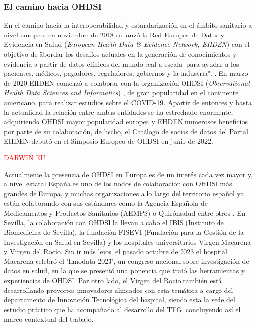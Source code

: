 
\subsubsection{El camino hacia OHDSI}

En el camino hacia la interoperabilidad y estandarización en el ámbito sanitario a nivel europeo, en noviembre de 2018 se lanzó la Red Europea de Datos y Evidencia en Salud (\textit{European Health Data \& Evidence Network, EHDEN}) con el objetivo de \"abordar los desafíos actuales en la generación de conocimientos y evidencia a partir de datos clínicos del mundo real a escala, para ayudar a los pacientes, médicos, pagadores, reguladores, gobiernos y la industria". \cite{ehden}. En marzo de 2020 EHDEN comenzó a colaborar con la organización OHDSI (\textit{Observational Health Data Sciences and Informatics}) \cite{ohdsi}, de gran popularidad en el continente americano, para realizar estudios sobre el COVID-19. Apartir de entonces y hasta la actualidad la relación entre ambas entidades se ha estrechado enormente, adquiriendo OHDSI mayor popularidad europea y EHDEN numerosos beneficios por parte de su colaboración, de hecho, el Catálogo de socios de datos del Portal EHDEN debutó en el Simposio Europeo de OHDSI en junio de 2022. 

\textcolor{red}{DARWIN EU}

Actualmente la presencia de OHDSI en Europa es de un interés cada vez mayor y, a nivel estatal España es uno de los nodos de colaboración con OHDSI más grandes de Europa, y muchas organizaciones a lo largo del territorio español ya están colaborando con sus estándares como la Agencia Española de Medicamentos y Productos Sanitarios (AEMPS) o Quirónsalud entre otros \cite{ohdsiSpain}. En Sevilla, la colaboración con OHDSI la llevan a cabo el IBIS (Instituto de Biomedicina de Sevilla), la fundación FISEVI (Fundación para la Gestión de la Investigación en Salud en Sevilla) y los hospitales universitarios Virgen Macarena y Virgen del Rocío. Sin ir más lejos, el pasado octubre de 2023 el hospital Macarena celebró el 'Innodata 2023', un congreso nacional sobre investigación de datos en salud, en la que se presentó una ponencia que trató las herramientas y experiencias de OHDSI. Por otro lado, el Virgen del Rocio también está desarrollando proyectos innovadores alineados con esta temática a cargo del departamento de Innovación Tecnológica del hospital, siendo esta la sede del estudio práctico que ha acompañado al desarrollo del TFG, concluyendo así el marco contextual del trabajo.


